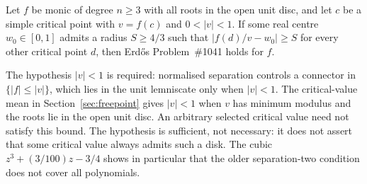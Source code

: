 \documentclass[11pt]{article}
\begin{document}
\begin{corollary}\label{res:separation-parent}
Let $f$ be monic of degree $n\ge3$ with all roots in the open unit disc, and
let $c$ be a simple critical point with $v=f(c)$ and $0<|v|<1$.  If some real centre
$w_0\in[0,1]$ admits a radius $S\ge4/3$ such that $|f(d)/v-w_0|\ge S$ for
every other critical point $d$, then Erd\H{o}s Problem~\#1041 holds for $f$.
\end{corollary}

\noindent The hypothesis $|v|<1$ is required: normalised separation controls a
connector in $\{|f|\le|v|\}$, which lies in the unit lemniscate only when
$|v|<1$.  The critical-value mean in Section~\ref{sec:freepoint} gives
$|v|<1$ when $v$ has minimum modulus and the roots lie in the open unit
disc. An arbitrary selected critical value need not satisfy this bound.
The hypothesis is sufficient, not necessary: it does not assert that some
critical value always admits such a disk.  The cubic
$z^3+(3/100)z-3/4$ shows in particular that the older separation-two
condition does not cover all polynomials.
\end{document}

